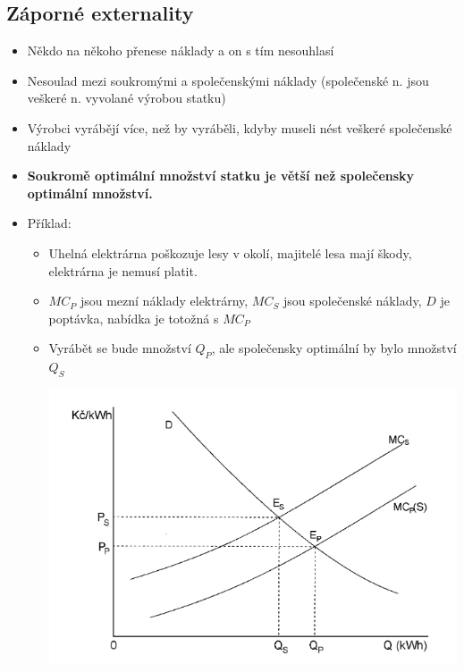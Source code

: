 \subsection{Záporné externality}
\begin{itemize}
    \item Někdo na někoho přenese náklady a on s tím nesouhlasí
    \item Nesoulad mezi soukromými a společenskými náklady (společenské n. jsou veškeré n. vyvolané výrobou statku)
    \item Výrobci vyrábějí více, než by vyráběli, kdyby museli nést veškeré společenské náklady
    \item \textbf{Soukromě optimální množství statku je větší než společensky optimální množství.}
    \item Příklad:
    \begin{itemize}
        \item Uhelná elektrárna poškozuje lesy v okolí, majitelé lesa mají škody, elektrárna je nemusí platit.
        \item $MC_P$ jsou mezní náklady elektrárny, $MC_S$ jsou společenské náklady, $D$ je poptávka, nabídka
        je totožná s $MC_P$
        \item Vyrábět se bude množství $Q_P$, ale společensky optimální by bylo množství $Q_S$
        
        
        \includegraphics[width=15cm]{images/22_zaporne.png}
    \end{itemize}
\end{itemize}

